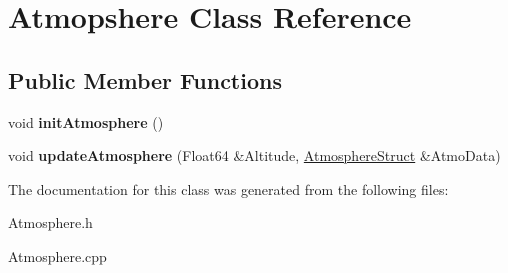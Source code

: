 \hypertarget{class_atmopshere}{}\section{Atmopshere Class Reference}
\label{class_atmopshere}
\subsection*{Public Member Functions}
\begin{DoxyCompactItemize}
\item 
\mbox{\label{class_atmopshere_a6e1d5763fbb6631784c99ee3c88911bd}} 
void {\bfseries init\+Atmosphere} ()
\item 
\mbox{\label{class_atmopshere_a2bd97471d32725d6196ee6816ea36c99}} 
void {\bfseries update\+Atmosphere} (Float64 \&Altitude, \hyperlink{group___data_cloud_struct_atmosphere_struct}{Atmosphere\+Struct} \&Atmo\+Data)
\end{DoxyCompactItemize}


The documentation for this class was generated from the following files\+:\begin{DoxyCompactItemize}
\item 
Atmosphere.\+h\item 
Atmosphere.\+cpp\end{DoxyCompactItemize}
